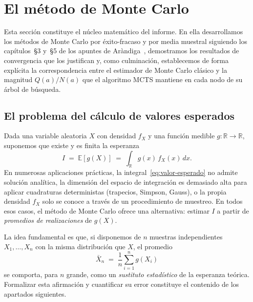 \section{El método de Monte Carlo}
\label{sec:monte-carlo}

Esta sección constituye el núcleo matemático del informe. En ella desarrollamos los métodos de Monte Carlo por éxito-fracaso y por media muestral siguiendo los capítulos~\S3 y~\S5 de los apuntes de Aràndiga~\cite{arandiga}, demostramos los resultados de convergencia que los justifican y, como culminación, establecemos de forma explícita la correspondencia entre el estimador de Monte Carlo clásico y la magnitud $Q(a)/N(a)$ que el algoritmo MCTS mantiene en cada nodo de su árbol de búsqueda.

\subsection{El problema del cálculo de valores esperados}
\label{subsec:problema-mc}

Dada una variable aleatoria $X$ con densidad $f_X$ y una función medible $g: \mathbb{R} \to \mathbb{R}$, suponemos que existe y es finita la esperanza
\begin{equation}
    I \;=\; \mathbb{E}[g(X)] \;=\; \int_{\mathbb{R}} g(x)\, f_X(x)\, dx.
    \label{eq:valor-esperado}
\end{equation}
En numerosas aplicaciones prácticas, la integral~\eqref{eq:valor-esperado} no admite solución analítica, la dimensión del espacio de integración es demasiado alta para aplicar cuadraturas deterministas (trapecios, Simpson, Gauss), o la propia densidad $f_X$ solo se conoce a través de un procedimiento de muestreo. En todos esos casos, el método de Monte Carlo ofrece una alternativa: estimar $I$ a partir de \emph{promedios de realizaciones} de $g(X)$.

La idea fundamental es que, si disponemos de $n$ muestras independientes $X_1, \ldots, X_n$ con la misma distribución que $X$, el promedio
\[
    \bar{X}_n \;=\; \frac{1}{n}\sum_{i=1}^{n} g(X_i)
\]
se comporta, para $n$ grande, como un \emph{sustituto estadístico} de la esperanza teórica. Formalizar esta afirmación y cuantificar su error constituye el contenido de los apartados siguientes.

